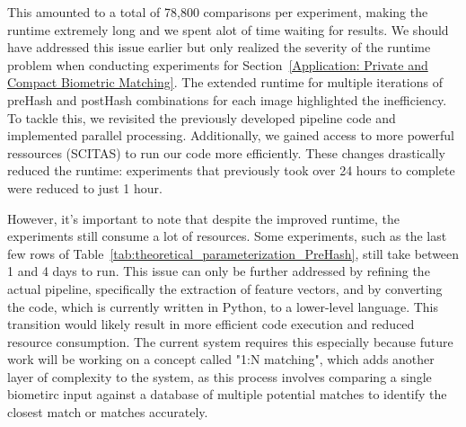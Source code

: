 This amounted to a total of 78,800 comparisons per experiment, making the runtime extremely long and we spent alot of time waiting for results. We should have addressed this issue earlier but only realized the severity of the runtime problem when conducting experiments for Section~\ref{Application: Private and Compact Biometric Matching}. The extended runtime for multiple iterations of preHash and postHash combinations for each image highlighted the inefficiency. To tackle this, we revisited the previously developed pipeline code and implemented parallel processing. Additionally, we gained access to more powerful ressources (SCITAS\cite{ref4}) to run our code more efficiently. These changes drastically reduced the runtime: experiments that previously took over 24 hours to complete were reduced to just 1 hour.

However, it's important to note that despite the improved runtime, the experiments still consume a lot of resources. Some experiments, such as the last few rows of Table~\ref{tab:theoretical_parameterization_PreHash}, still take between 1 and 4 days to run. This issue can only be further addressed by refining the actual pipeline, specifically the extraction of feature vectors, and by converting the code, which is currently written in Python, to a lower-level language. This transition would likely result in more efficient code execution and reduced resource consumption. The current system requires this especially because future work will be working on a concept called "1:N matching", which adds another layer of complexity to the system, as this process involves comparing a single biometirc input against a database of multiple potential matches to identify the closest match or matches accurately.